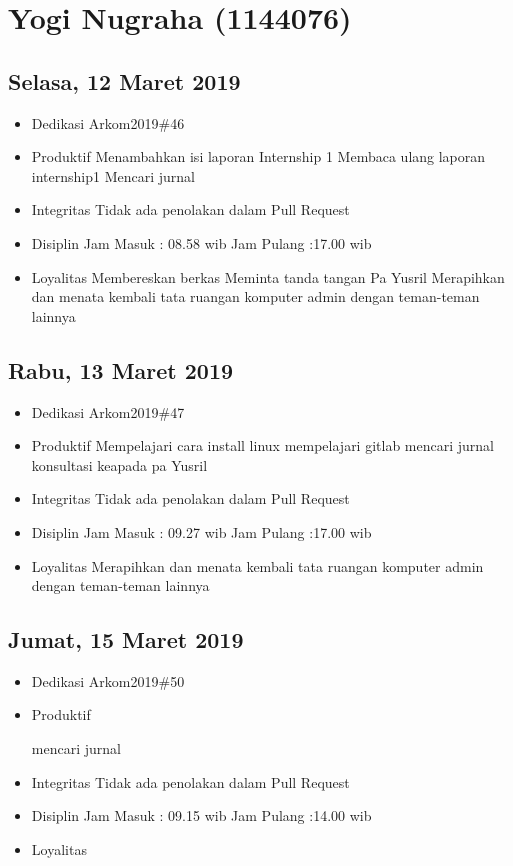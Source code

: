 \chapter{Yogi Nugraha (1144076)}

\section{Selasa, 12 Maret 2019}
\begin{itemize}
\item Dedikasi
\subitem Arkom2019\#46
\item Produktif
  \subitem Menambahkan isi laporan Internship 1
  \subitem Membaca ulang laporan internship1
  \subitem Mencari jurnal
\item Integritas
  \subitem Tidak ada penolakan dalam Pull Request
\item Disiplin
  \subitem Jam Masuk : 08.58 wib
  \subitem Jam Pulang :17.00 wib
\item Loyalitas
  \subitem Membereskan berkas  
  \subitem Meminta tanda tangan Pa Yusril
  \subitem Merapihkan dan menata kembali tata ruangan komputer admin dengan teman-teman lainnya
\end{itemize}


\section{Rabu, 13 Maret 2019}
\begin{itemize}
\item Dedikasi
\subitem Arkom2019\#47
\item Produktif
  \subitem Mempelajari cara install linux
  \subitem mempelajari gitlab 
  \subitem mencari jurnal
  \subitem konsultasi keapada pa Yusril
\item Integritas
  \subitem Tidak ada penolakan dalam Pull Request
\item Disiplin
  \subitem Jam Masuk : 09.27 wib
  \subitem Jam Pulang :17.00 wib
\item Loyalitas
  \subitem Merapihkan dan menata kembali tata ruangan komputer admin dengan teman-teman lainnya
\end{itemize}

\section{Jumat, 15 Maret 2019}
\begin{itemize}
\item Dedikasi
\subitem Arkom2019\#50
\item Produktif
 
  \subitem mencari jurnal

\item Integritas
  \subitem Tidak ada penolakan dalam Pull Request
\item Disiplin
  \subitem Jam Masuk : 09.15 wib
  \subitem Jam Pulang :14.00 wib
\item Loyalitas
  \subitem 
\end{itemize}


